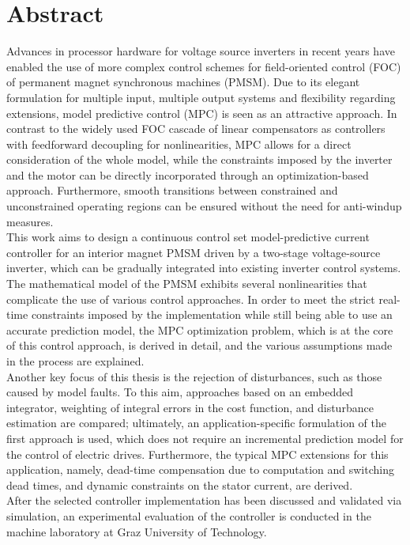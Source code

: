 % 
%

%

\chapter*{\centering Abstract}
Advances in processor hardware for voltage source inverters in recent years have enabled the use of more complex control schemes for field-oriented control (FOC) of permanent magnet synchronous machines (PMSM). Due to its elegant formulation for multiple input, multiple output systems and flexibility regarding extensions, model predictive control (MPC) is seen as an attractive approach. In contrast to the widely used FOC cascade of linear compensators as controllers with feedforward decoupling for nonlinearities, MPC allows for a direct consideration of the whole model, while the constraints imposed by the inverter and the motor can be directly incorporated through an optimization-based approach. Furthermore, smooth transitions between constrained and unconstrained operating regions can be ensured without the need for anti-windup measures.\\
This work aims to design a continuous control set model-predictive current controller for an interior magnet PMSM driven by a two-stage voltage-source inverter, which can be gradually integrated into existing inverter control systems. The mathematical model of the PMSM exhibits several nonlinearities that complicate the use of various control approaches. In order to meet the strict real-time constraints imposed by the implementation while still being able to use an accurate prediction model, the MPC optimization problem, which is at the core of this control approach, is derived in detail, and the various assumptions made in the process are explained.\\
Another key focus of this thesis is the rejection of disturbances, such as those caused by model faults. To this aim, approaches based on an embedded integrator, weighting of integral errors in the cost function, and disturbance estimation are compared; ultimately, an application-specific formulation of the first approach is used, which does not require an incremental prediction model for the control of electric drives. Furthermore, the typical MPC extensions for this application, namely, dead-time compensation due to computation and switching dead times, and dynamic constraints on the stator current, are derived.\\
After the selected controller implementation has been discussed and validated via simulation, an experimental evaluation of the controller is conducted in the machine laboratory at Graz University of Technology.

